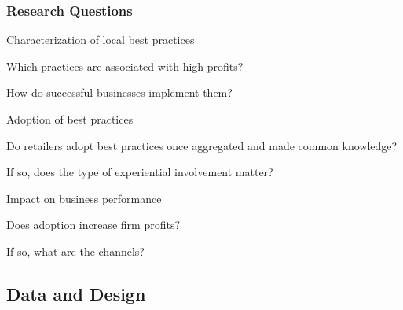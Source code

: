 \documentclass[hideothersubsections, usenames,dvipsnames,11pt]{beamer}
\newenvironment{itemize_2pt}{\itemize\addtolength{\itemsep}{2pt}}{\enditemize}
\begin{document}
\begin{frame}
\frametitle{Research Questions}

	\textcolor{bdf}{Characterization of local best practices}
	\begin{itemize_2pt}
		\item Which practices are associated with high profits?
		\item How do successful businesses implement them?
	\end{itemize_2pt}
	\vspace{1.0em}
	
	\textcolor{bdf}{Adoption of best practices}
	\begin{itemize_2pt}
		\item Do retailers adopt best practices once aggregated and made common knowledge?
		\item If so, does the type of experiential involvement matter?

	\end{itemize_2pt}
    \vspace{1.0em}
    
	\textcolor{bdf}{Impact on business performance}
	\begin{itemize_2pt}
		\item Does adoption increase firm profits?
		\item If so, what are the channels?
	\end{itemize_2pt}

\end{frame}

\subsection{Data and Design}
\end{document}
